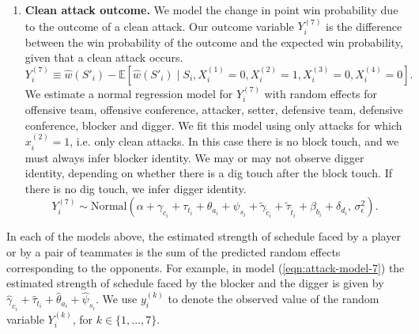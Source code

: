 \documentclass[USenglish]{article}
\theoremstyle{dgthm}
\theoremstyle{dgdef}
\begin{document}
\begin{enumerate}
    \item
        {\bf Clean attack outcome.} We model the change in point win probability due to the outcome of a clean attack. Our outcome variable $Y_i^{(7)}$ is the difference between the win probability of the outcome and the expected win probability, given that a clean attack occurs.
        \begin{equation*}
            Y_i^{(7)} \equiv \hat w(S'_i) - \mathbb{E}\left[\hat w(S'_i) \mid S_i, X_i^{(1)} = 0, X_i^{(2)} = 1, X_i^{(3)} = 0, X_i^{(4)} = 0\right].
        \end{equation*}
        We estimate a normal regression model for $Y_i^{(7)}$ with random effects for offensive team, offensive conference, attacker, setter, defensive team, defensive conference, blocker and digger. We fit this model using only attacks for which $x_i^{(2)} = 1$, i.e. only clean attacks. In this case there is no block touch, and we must always infer blocker identity. We may or may not observe digger identity, depending on whether there is a dig touch after the block touch. If there is no dig touch, we infer digger identity.
        \begin{equation}
        \label{eqn:attack-model-7}
            Y_i^{(7)} \sim \mbox{Normal}\left(
                \alpha + \gamma_{c_i} + \tau_{t_i} + \theta_{a_i} + \psi_{s_i} + \tilde\gamma_{\tilde c_i} + \tilde\tau_{\tilde t_i} + \beta_{b_i} + \delta_{d_i},\,
                \sigma^2_\epsilon
            \right).
        \end{equation}
\end{enumerate}

In each of the models above, the estimated strength of schedule faced by a player or by a pair of teammates is the sum of the predicted random effects corresponding to the opponents. For example, in model (\ref{eqn:attack-model-7}) the estimated strength of schedule faced by the blocker and the digger is given by $\hat\gamma_{c_i} + \hat\tau_{t_i} + \hat\theta_{a_i} + \hat\psi_{s_i}$. We use $y_i^{(k)}$ to denote the observed value of the random variable $Y_i^{(k)}$, for $k \in \{1, ..., 7\}$.
\end{document}
